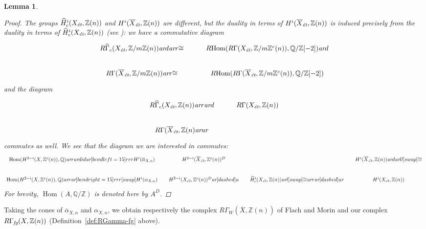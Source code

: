 \documentclass[leqno,12pt]{article}
\theoremstyle{plain}
\newtheorem{lemma}[theorem]{\indent\sc Lemma}
\theoremstyle{definition}
\DeclareMathOperator{\Hom}{Hom}
\newcommand{\QQ}{\mathbb{Q}}
\newcommand{\ZZ}{\mathbb{Z}}
\newcommand{\ar}{\text{\it ar}}
\newcommand{\et}{\text{\it \'{e}t}}
\newcommand{\fg}{\text{\it fg}}
\newcommand{\RHom}{R\!\Hom}
\begin{document}
\begin{lemma}
\begin{proof}
    The groups $\widehat{H}^i_c (X_\et, \ZZ (n))$ and
    $H^i (\overline{X}_\et, \ZZ (n))$ are different, but the duality in terms of
    $H^i (\overline{X}_\et, \ZZ (n))$ is induced precisely from the duality in
    terms of $\widehat{H}^i_c (X_\et, \ZZ (n))$
    (see \cite[Theorem~6.24]{Flach-Morin-2018}): we have a commutative diagram
    \[ \begin{tikzcd}
        R\widehat{\Gamma}_c (X_\et, \ZZ/m\ZZ(n)) \ar{d}\ar{r}{\cong} & \RHom (R\Gamma (X_\et, \ZZ/m\ZZ^c (n)), \QQ/\ZZ [-2])\ar{d} \\
        R\Gamma (\overline{X}_\et, \ZZ/m\ZZ(n)) \ar{r}{\cong} & \RHom (R\Gamma (\overline{X}_\et, \ZZ/m\ZZ^c (n)), \QQ/\ZZ [-2])
      \end{tikzcd} \]
    and the diagram
    \[ \begin{tikzcd}
        R\widehat{\Gamma}_c (X_\et, \ZZ(n)) \ar{r}\ar{d} & R\Gamma (X_\et, \ZZ(n)) \\
        R\Gamma (\overline{X}_\et, \ZZ(n) \ar{ur}
      \end{tikzcd} \]
    commutes as well. We see that the diagram we are interested in commutes:
    \[ \begin{tikzcd}[column sep=1.25em]
        \Hom (H^{2-i} (X, \ZZ^c (n)), \QQ) \ar{r}\ar{d}{id} \ar[bend left=15]{rrr}{H^i (\overline{\alpha}_{X,n})} & H^{2-i} (\overline{X}_\et, \ZZ^c (n))^D & & H^i (\overline{X}_\et, \ZZ(n))\ar{d} \ar{ll}[swap]{\cong} \\
        \Hom (H^{2-i} (X, \ZZ^c (n)), \QQ) \ar{r} \ar[bend right=15]{rrr}[swap]{H^i (\alpha_{X,n})} & H^{2-i} (X_\et, \ZZ^c (n))^D \ar[dashed]{u} & \widehat{H}^i_c (X_\et, \ZZ(n)) \ar{l}[swap]{\cong}\ar{r}\ar[dashed]{ur} & H^i (X_\et, \ZZ(n))
      \end{tikzcd} \]
    For brevity, $\Hom (A,\QQ/\ZZ)$ is denoted here by $A^D$.
  \end{proof}
\end{lemma}

Taking the cones of $\overline{\alpha}_{X,n}$ and $\alpha_{X,n}$, we obtain
respectively the complex $R\Gamma_W (\overline{X}, \ZZ (n))$ of Flach and Morin
\cite[Definition~3.6]{Flach-Morin-2018} and our complex
$R\Gamma_\fg (X, \ZZ(n))$ (Definition~\ref{def:RGamma-fg} above).
\end{document}
